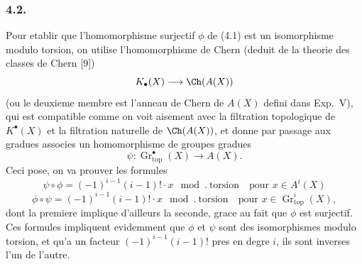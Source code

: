 \subsubsection*{4.2.}
Pour etablir que l'homomorphisme surjectif $\phi$ de (4.1) est un isomorphisme modulo torsion, on utilise l'homomorphisme de Chern (deduit de la theorie des classes de Chern [9])
\[
K_{\bullet}(X) \longrightarrow \Ch(A(X))
\]
(ou le deuxieme membre est l'anneau de Chern de $A(X)$ defini dans Exp.\ V), qui est compatible comme on voit aisement avec la filtration topologique de $K^{\bullet}(X)$ et la filtration naturelle de $\Ch(A(X))$, et donne par passage aux gradues associes un homomorphisme de groupes gradues
\[
\psi : \operatorname{Gr}_{\mathrm{top}}^{\bullet}(X) \longrightarrow A(X). \tag{4.3}
\]
Ceci pose, on va prouver les formules
\[
\psi \circ \phi = (-1)^{i-1}(i-1)! \cdot x \mod.\ \text{torsion} \quad \text{pour } x \in A^{i}(X) \tag{4.4}
\]
\[
\phi \circ \psi = (-1)^{i-1}(i-1)! \cdot x \mod.\ \text{torsion} \quad \text{pour } x \in \operatorname{Gr}_{\mathrm{top}}^{i}(X),
\]
dont la premiere implique d'ailleurs la seconde, grace au fait que $\phi$ est surjectif. Ces formules impliquent evidemment que $\phi$ et $\psi$ sont des isomorphismes modulo torsion, et qu'a un facteur $(-1)^{i-1}(i-1)!$ pres en degre $i$, ils sont inverses l'un de l'autre.

